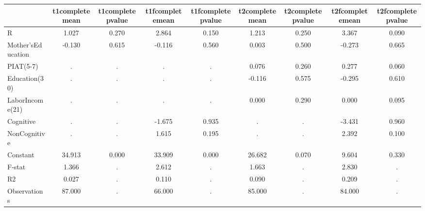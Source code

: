 \begin{table}[htbp]
\begin{tabular}{lcccccccc} \hline \hline
 & t1completemean  & t1completepvalue  & t1fcompletemean  & t1fcompletepvalue  & t2completemean  & t2completepvalue  & t2fcompletemean  & t2fcompletepvalue  \\  \hline 
R &     1.027 &     0.270 &     2.864 &     0.150 &     1.213 &     0.250 &     3.367 &     0.090 \\  
Mother'sEducation &    -0.130 &     0.615 &    -0.116 &     0.560 &     0.003 &     0.500 &    -0.273 &     0.665 \\  
PIAT(5-7) &         . &         . &         . &         . &     0.076 &     0.260 &     0.277 &     0.060 \\  
Education(30) &         . &         . &         . &         . &    -0.116 &     0.575 &    -0.295 &     0.610 \\  
LaborIncome(21) &         . &         . &         . &         . &     0.000 &     0.290 &     0.000 &     0.095 \\  
Cognitive &         . &         . &    -1.675 &     0.935 &         . &         . &    -3.431 &     0.960 \\  
NonCognitive &         . &         . &     1.615 &     0.195 &         . &         . &     2.392 &     0.100 \\  
Constant &    34.913 &     0.000 &    33.909 &     0.000 &    26.682 &     0.070 &     9.604 &     0.330 \\  
F-stat &     1.366 &         . &     2.612 &         . &     1.663 &         . &     2.830 &         . \\  
R2 &     0.027 &         . &     0.110 &         . &     0.090 &         . &     0.209 &         . \\  
Observations &    87.000 &         . &    66.000 &         . &    85.000 &         . &    84.000 &         . \\  
\hline \hline \end{tabular}
\end{table}
